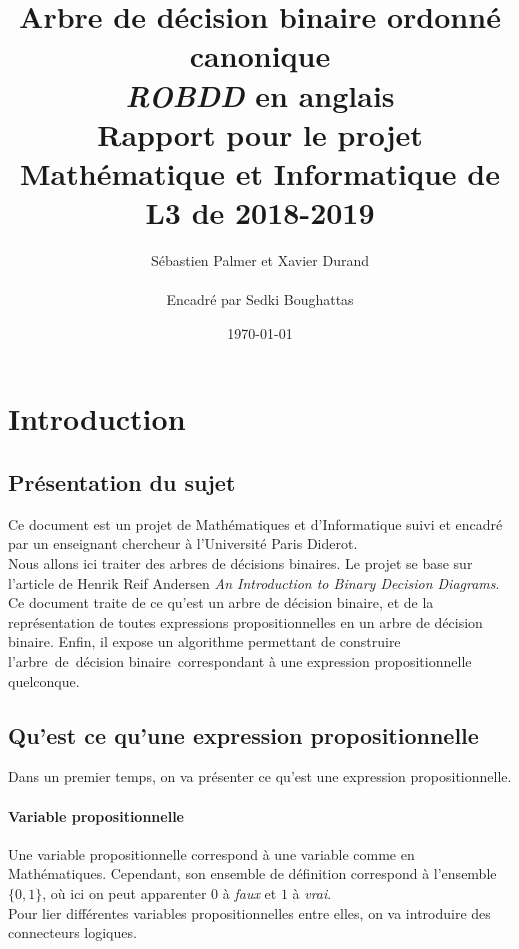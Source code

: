 \documentclass[a4paper, oneside]{report}
\newcommand{\adb}{arbre~de~décision binaire~}
\begin{document}
\title{Arbre de décision binaire ordonné canonique \\ \textit{ROBDD} en anglais \\ Rapport pour le projet Mathématique et Informatique de L3 de 2018-2019  }
\date{\today}
\author{Sébastien Palmer et Xavier Durand \\~\\ Encadré par Sedki Boughattas }
\maketitle

\tableofcontents{}

\newpage

\chapter*{Introduction}

\section*{Présentation du sujet}
Ce document est un projet de Mathématiques et d'Informatique suivi et encadré par un enseignant chercheur à l'Université Paris Diderot.\\
Nous allons ici traiter des arbres de décisions binaires. Le projet se base sur l'article de Henrik Reif Andersen \og\textit{An Introduction to Binary Decision Diagrams}\fg{}.\\
Ce document traite de ce qu'est un arbre de décision binaire, et de la représentation de toutes expressions propositionnelles en un arbre de décision binaire. Enfin, il expose un algorithme permettant de construire l'\adb correspondant à une expression propositionnelle quelconque.\\

\section*{Qu'est ce qu'une expression propositionnelle}

Dans un premier temps, on va présenter ce qu'est une expression propositionnelle.\\
\subsubsection*{Variable propositionnelle}
Une variable propositionnelle correspond à une variable comme en Mathématiques. Cependant, son ensemble de définition correspond à l'ensemble $\{0,1\}$, où ici on peut apparenter $0$ à \textit{faux} et $1$ à \textit{vrai}.\\
Pour lier différentes variables propositionnelles entre elles, on va introduire des connecteurs logiques.
\end{document}
